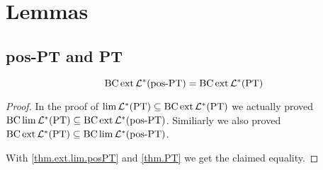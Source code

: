 \section{Lemmas}


\subsection{pos-PT and PT}

\begin{thm}
\[ \operatorname{BC} \operatorname{ext} \mathcal{L}^*(\textup{\textrm{pos-PT}}) = \operatorname{BC} \operatorname{ext} \mathcal{L}^* (\textup{\textrm{PT}}) \]
\end{thm}

\begin{proof}
In the proof of $\lim \mathcal{L}^*(\textup{\textrm{PT}}) \subseteq \operatorname{BC} \operatorname{ext} \mathcal{L}^* (\textup{\textrm{PT}})$ we actually proved $\operatorname{BC} \lim \mathcal{L}^*(\textup{\textrm{PT}}) \subseteq \operatorname{BC} \operatorname{ext} \mathcal{L}^* (\textup{\textrm{pos-PT}})$. Similiarly we also proved $\operatorname{BC} \operatorname{ext} \mathcal{L}^* (\textup{\textrm{PT}}) \subseteq \operatorname{BC} \lim \mathcal{L}^* (\textup{\textrm{pos-PT}})$.

With \ref{thm.ext.lim.posPT} and \ref{thm.PT} we get the claimed equality.
\end{proof}

